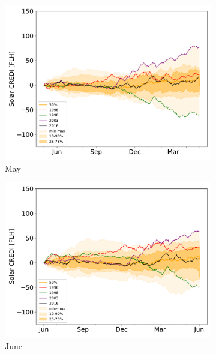 \documentclass[12pt]{iopart}
\begin{document}
\begin{figure}[t]
\begin{subfigure}[t]{0.32\linewidth}
    \includegraphics[width=\linewidth]{Figures_SI/Fig_CUMSUM_YearStart_SPV_May}
    \caption{May }
\end{subfigure}
\begin{subfigure}[t]{0.32\linewidth}
    \includegraphics[width=\linewidth]{Figures_SI/Fig_CUMSUM_YearStart_SPV_June}
    \caption{June }
\end{subfigure}
\begin{subfigure}[t]{0.32\linewidth}

\end{subfigure}
\end{figure}
\end{document}
